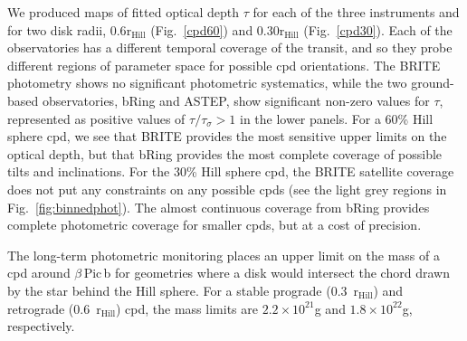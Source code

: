 \documentclass[longauth]{aa} %
\newcommand{\rhill}{$\mathrm{r_{Hill}}$} %
\newcommand{\bpb}{$\beta$\,Pic\,b}
\begin{document}
We produced maps of fitted optical depth $\tau$ for each of the three instruments and for two disk radii, 0.6\rhill{} (Fig.~\ref{cpd60}) and 0.30\rhill{} (Fig.~\ref{cpd30}).
%
Each of the observatories has a different temporal coverage of the transit, and so they probe different regions of parameter space for possible \ac{cpd} orientations.
%
The BRITE photometry shows no significant photometric systematics, while the two ground-based observatories, bRing and ASTEP, show significant non-zero values for $\tau$, represented as positive values of $\tau / \tau_\sigma > 1$ in the lower panels.
%
For a 60\% Hill sphere \ac{cpd}, we see that BRITE provides the most sensitive upper limits on the optical depth, but that bRing provides the most complete coverage of possible tilts and inclinations.
%
For the 30\% Hill sphere \ac{cpd}, the BRITE satellite coverage does not put any constraints on any possible \ac{cpd}s (see the light grey regions in Fig.~\ref{fig:binnedphot}).
%
The almost continuous coverage from bRing provides complete photometric coverage for smaller \ac{cpd}s, but at a cost of precision.

The long-term photometric monitoring places an upper limit on the mass of a \ac{cpd} around \bpb{} for geometries where a disk would intersect the chord drawn by the star behind the Hill sphere.
%
For a stable prograde (0.3\ \rhill{}) and retrograde (0.6\ \rhill{}) \ac{cpd}, the mass limits are $2.2\times 10^{21}$g and $1.8\times 10^{22}$g, respectively.
%
\end{document}
